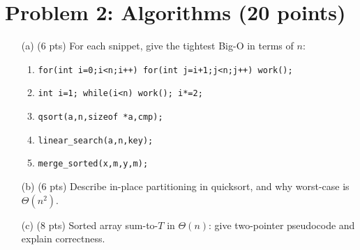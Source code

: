 \documentclass[12pt]{article}
\begin{document}
\section*{Problem 2: Algorithms (20 points)}
\begin{enumerate}
  \item[(a)] (6 pts) For each snippet, give the tightest Big-O in terms of \(n\):\\
  \begin{enumerate}
    \item \texttt{for(int i=0;i<n;i++) for(int j=i+1;j<n;j++) work();}
    \item \texttt{int i=1; while(i<n){ work(); i*=2; }}
    \item \texttt{qsort(a,n,sizeof *a,cmp);}
    \item \texttt{linear\_search(a,n,key);}
    \item \texttt{merge\_sorted(x,m,y,m);}
  \end{enumerate}

  \item[(b)] (6 pts) Describe in-place partitioning in quicksort, and why worst-case is \(\Theta(n^2)\).

  \item[(c)] (8 pts) Sorted array sum-to-\(T\) in \(\Theta(n)\): give two-pointer pseudocode and explain correctness.
\end{enumerate}

\end{document}
